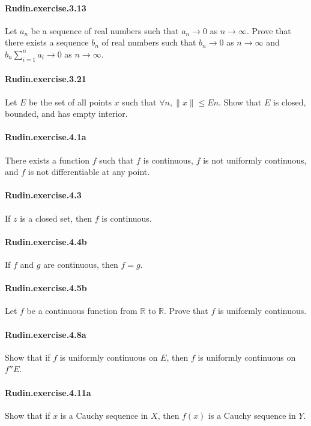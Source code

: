 \documentclass{article}
\begin{document}
\paragraph{Rudin.exercise.3.13} Let $a_n$ be a sequence of real numbers such that $a_n \to 0$ as $n \to \infty$. Prove that there exists a sequence $b_n$ of real numbers such that $b_n \to 0$ as $n \to \infty$ and $b_n \sum_{i=1}^n a_i \to 0$ as $n \to \infty$.

\paragraph{Rudin.exercise.3.21} Let $E$ be the set of all points $x$ such that $∀ n, ∥x∥ ≤ E n$. Show that $E$ is closed, bounded, and has empty interior.

\paragraph{Rudin.exercise.4.1a} There exists a function $f$ such that $f$ is continuous, $f$ is not uniformly continuous, and $f$ is not differentiable at any point.

\paragraph{Rudin.exercise.4.3} If $z$ is a closed set, then $f$ is continuous.

\paragraph{Rudin.exercise.4.4b} If $f$ and $g$ are continuous, then $f = g$.

\paragraph{Rudin.exercise.4.5b} Let $f$ be a continuous function from $\mathbb{R}$ to $\mathbb{R}$. Prove that $f$ is uniformly continuous.

\paragraph{Rudin.exercise.4.8a} Show that if $f$ is uniformly continuous on $E$, then $f$ is uniformly continuous on $f '' E$.

\paragraph{Rudin.exercise.4.11a} Show that if $x$ is a Cauchy sequence in $X$, then $f(x)$ is a Cauchy sequence in $Y$.
\end{document}
